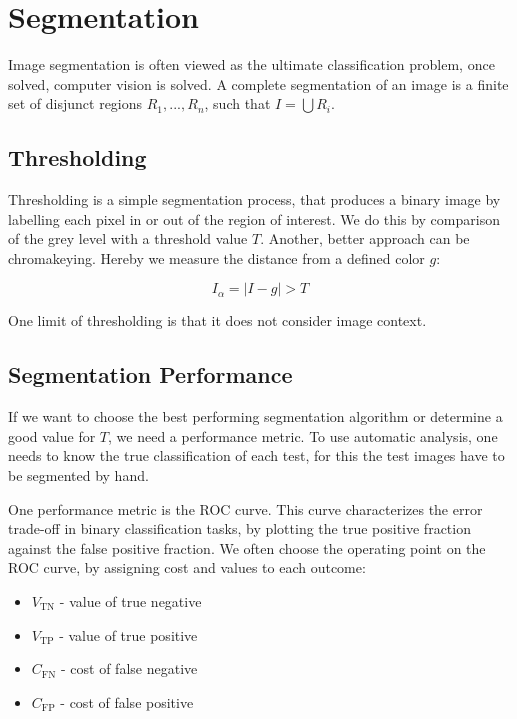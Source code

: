 \section{Segmentation}

Image segmentation is often viewed as the ultimate classification problem, once solved, computer vision is solved. A complete segmentation of an image is a finite set of disjunct regions $R_1, ..., R_n$, such that $I = \bigcup R_i$.


\subsection{Thresholding}

Thresholding is a simple segmentation process, that produces a binary image by labelling each pixel in or out of the region of interest. We do this by comparison of the grey level with a threshold value $T$. Another, better approach can be chromakeying. Hereby we measure the distance from a defined color $g$:

$$I_\alpha = |I - g| > T$$

One limit of thresholding is that it does not consider image context.


\subsection{Segmentation Performance}

If we want to choose the best performing segmentation algorithm or determine a good value for $T$, we need a performance metric. To use automatic analysis, one needs to know the true classification of each test, for this the test images have to be segmented by hand.

One performance metric is the ROC curve. This curve characterizes the error trade-off in binary classification tasks, by plotting the true positive fraction against the false positive fraction. We often choose the operating point on the ROC curve, by assigning cost and values to each outcome:
\begin{itemize}
	\item $V_{\text{TN}}$ - value of true negative
	\item $V_{\text{TP}}$ - value of true positive
	\item $C_{\text{FN}}$ - cost of false negative
	\item $C_{\text{FP}}$ - cost of false positive
\end{itemize}

